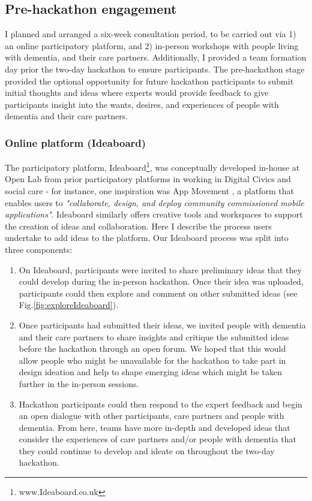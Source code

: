\subsection{Pre-hackathon engagement}
\label{sec:EventPrehackathon}
I planned and arranged a six-week consultation period, to be carried out via 1) an online participatory platform, and 2) in-person workshops with people living with dementia, and their care partners. Additionally, I provided a team formation day prior the two-day hackathon to ensure participants. The pre-hackathon stage provided the optional opportunity for future hackathon participants to submit initial thoughts and ideas where experts would provide feedback to give participants insight into the wants, desires, and experiences of people with dementia and their care partners. 

\subsubsection{Online platform (Ideaboard)}
\label{sec:Ideaboard}
The participatory platform, Ideaboard\footnote{www.Ideaboard.co.uk}, was conceptually developed in-house at Open Lab from prior participatory platforms in working in Digital Civics and social care - for instance, one inspiration was App Movement \citep{garbett_app_2016}, a platform that enables users to \textit{"collaborate, design, and deploy community commissioned mobile applications"}. Ideaboard similarly offers creative tools and workspaces to support the creation of ideas and collaboration. Here I describe the process users undertake to add ideas to the platform. Our Ideaboard process was split into three components:

\begin{enumerate}
    \item On Ideaboard, participants were invited to share preliminary ideas that they could develop during the in-person hackathon. Once their idea was uploaded, participants could then explore and comment on other submitted ideas (see Fig.\ref{fig:exploreIdeaboard}).
    \item Once participants had submitted their ideas, we invited people with dementia and their care partners to share insights and critique the submitted ideas before the hackathon through an open forum. We hoped that this would allow people who might be unavailable for the hackathon to take part in design ideation and help to shape emerging ideas which might be taken further in the in-person sessions. 
    \item Hackathon participants could then respond to the expert feedback and begin an open dialogue with other participants, care partners and people with dementia. From here, teams have more in-depth and developed ideas that consider the experiences of care partners and/or people with dementia that they could continue to develop and ideate on throughout the two-day hackathon. 
\end{enumerate}

